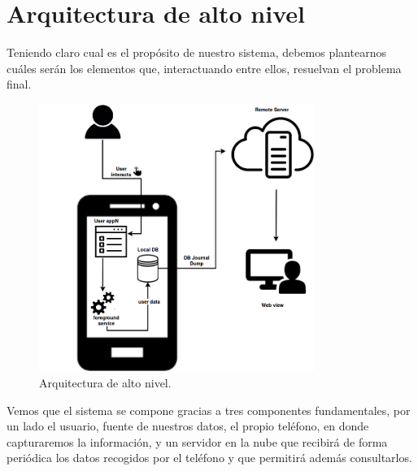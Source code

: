 \documentclass[12pt,a4paper,oneside]{book} %
\begin{document}
\section{Arquitectura de alto nivel}
Teniendo claro cual es el propósito de nuestro sistema, debemos plantearnos cuáles serán los elementos que, interactuando entre ellos, resuelvan el problema final. 
\newline 
\newline
 

\begin{figure}[H]
  \begin{center}
     \includegraphics[width=0.8\textwidth]{pictures/architecture/highLevel/altonivel01.png}
  \end{center}
  \caption[Arquitectura de alto nivel]{Arquitectura de alto nivel.}
  \label{fig:LandscapeFigure}
\end{figure}

\newpage
Vemos que el sistema se compone gracias a tres componentes fundamentales, por un lado el usuario, fuente de nuestros datos, el propio teléfono, en donde capturaremos la información, y un servidor en la nube que recibirá de forma periódica los datos recogidos por el teléfono y que permitirá además consultarlos. 
\newline
\newline
\end{document}
